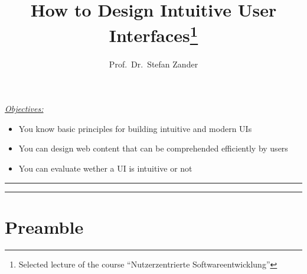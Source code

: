 \documentclass[a4paper, justified, notoc]{tufte-handout} %
\title{How to Design Intuitive User Interfaces\thanks{Selected lecture of the course ``Nutzerzentrierte Softwareentwicklung''}}
\author[opt Author]{Prof.\ Dr.\ Stefan Zander}
\newenvironment{lernziele}{
	\begin{mdframed}[hidealllines=true,backgroundcolor=gray!20] 
	\small \itshape
	\noindent \underline{Objectives:} 
	} 
	{ 
	\end{mdframed}
}
\begin{document}
\maketitle%


\begin{lernziele}
\begin{itemize}
	\item You know basic principles for building intuitive and modern UIs
	\item You can design web content that can be comprehended efficiently by users
	\item You can evaluate wether a UI is intuitive or not
\end{itemize}
\end{lernziele}


\setcounter{secnumdepth}{2} %

\noindent \rule{1.54\textwidth}{0.4pt}
\tableofcontents
\noindent \rule{1.54\textwidth}{0.4pt}

\section{Preamble}\label{sec:introduction}
\end{document}
